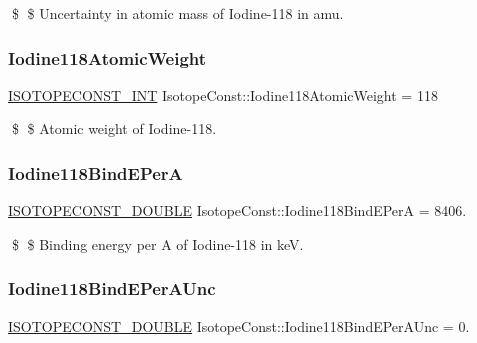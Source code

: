 \$ \$ Uncertainty in atomic mass of Iodine-\/118 in amu. \mbox{\label{group___isotope_const-_iodine-_i118_ga8dc7162d1e5d9da61b0bf877bc1e01b7}} 
\subsubsection{\texorpdfstring{Iodine118\+Atomic\+Weight}{Iodine118AtomicWeight}}
{\footnotesize\ttfamily \mbox{\hyperlink{group___isotope_const-_macros_ga5f18360b3e99483a35c32d789e62621c}{I\+S\+O\+T\+O\+P\+E\+C\+O\+N\+S\+T\+\_\+\+I\+NT}} Isotope\+Const\+::\+Iodine118\+Atomic\+Weight = 118}

\$ \$ Atomic weight of Iodine-\/118. \mbox{\label{group___isotope_const-_iodine-_i118_gae069c5e9604b4fc2eb6e180255d75189}} 
\subsubsection{\texorpdfstring{Iodine118\+Bind\+E\+PerA}{Iodine118BindEPerA}}
{\footnotesize\ttfamily \mbox{\hyperlink{group___isotope_const-_macros_ga8f45a7272ce02c0b4c65c44636ed719a}{I\+S\+O\+T\+O\+P\+E\+C\+O\+N\+S\+T\+\_\+\+D\+O\+U\+B\+LE}} Isotope\+Const\+::\+Iodine118\+Bind\+E\+PerA = 8406.}

\$ \$ Binding energy per A of Iodine-\/118 in keV. \mbox{\label{group___isotope_const-_iodine-_i118_gadd5883d24c2d8d6d65e1b5c473adaf80}} 
\subsubsection{\texorpdfstring{Iodine118\+Bind\+E\+Per\+A\+Unc}{Iodine118BindEPerAUnc}}
{\footnotesize\ttfamily \mbox{\hyperlink{group___isotope_const-_macros_ga8f45a7272ce02c0b4c65c44636ed719a}{I\+S\+O\+T\+O\+P\+E\+C\+O\+N\+S\+T\+\_\+\+D\+O\+U\+B\+LE}} Isotope\+Const\+::\+Iodine118\+Bind\+E\+Per\+A\+Unc = 0.}

